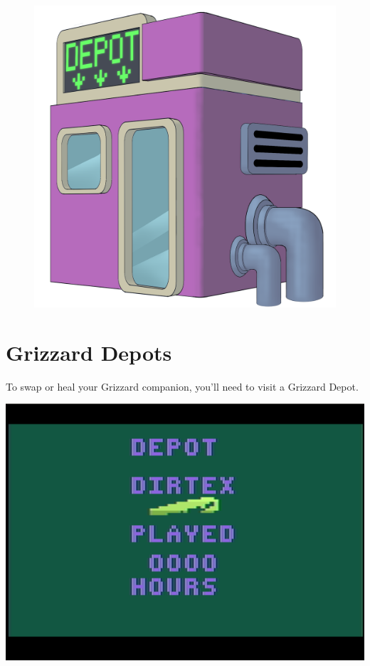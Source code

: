 \documentclass[9pt,twocolumn,openany,article]{memoir}
\begin{document}
\fi \fi

\begin{figure}[t]
  \begin{center}
    \includegraphics[width=1.6667\columnwidth]{../Manual/GrizzardDepot.png}
  \end{center}
\end{figure}

\section{Grizzard Depots}\label{sec:GrizzardDepot}

To  \ifdefined\NOSAVE\else swap  or  \fi heal  your Grizzard  companion,
you'll need to visit a Grizzard Depot.

\begin{center}
  \includegraphics[width=.75\columnwidth]{../Manual/DepotScreenshotNTSC.png}
\end{center}
\end{document}
